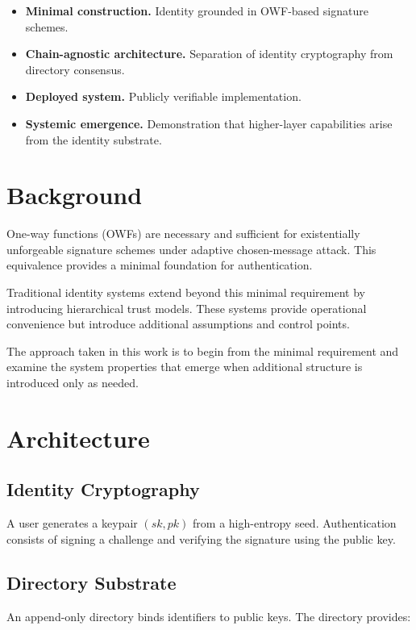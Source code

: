 \documentclass[11pt,a4paper]{article}
\begin{document}
\begin{itemize}
\item \textbf{Minimal construction.} Identity grounded in OWF-based signature schemes.
\item \textbf{Chain-agnostic architecture.} Separation of identity cryptography from directory consensus.
\item \textbf{Deployed system.} Publicly verifiable implementation.
\item \textbf{Systemic emergence.} Demonstration that higher-layer capabilities arise from the identity substrate.
\end{itemize}

\section{Background}

One-way functions (OWFs) are necessary and sufficient for existentially unforgeable signature schemes under adaptive chosen-message attack. This equivalence provides a minimal foundation for authentication.

Traditional identity systems extend beyond this minimal requirement by introducing hierarchical trust models. These systems provide operational convenience but introduce additional assumptions and control points.

The approach taken in this work is to begin from the minimal requirement and examine the system properties that emerge when additional structure is introduced only as needed.

\section{Architecture}

\subsection{Identity Cryptography}

A user generates a keypair $(sk, pk)$ from a high-entropy seed. Authentication consists of signing a challenge and verifying the signature using the public key.

\subsection{Directory Substrate}

An append-only directory binds identifiers to public keys. The directory provides:
\end{document}
